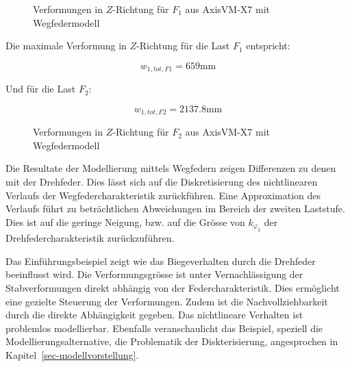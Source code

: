 \documentclass[
  11pt,
  letterpaper,
]{scrreprt}
\begin{document}
\begin{figure}[H]


\caption{\label{fig-f1-wegfeder}Verformungen in \(Z\)-Richtung für
\(F_1\) aus AxisVM-X7 mit Wegfedermodell}

\end{figure}%

Die maximale Verformung in \(Z\)-Richtung für die Last \(F_1\)
entspricht:

\[
w_{1,tot,F1} = 659 \text{mm}
\]

Und für die Last \(F_2\):

\[
w_{1,tot,F2} = 2137.8 \text{mm}
\]

\begin{figure}[H]


\caption{\label{fig-f2-wegfeder}Verformungen in \(Z\)-Richtung für
\(F_2\) aus AxisVM-X7 mit Wegfedermodell}

\end{figure}%

Die Resultate der Modellierung mittels Wegfedern zeigen Differenzen zu
denen mit der Drehfeder. Dies lässt sich auf die Diskretisierung des
nichtlinearen Verlaufs der Wegfedercharakteristik zurückführen. Eine
Approximation des Verlaufs führt zu beträchtlichen Abweichungen im
Bereich der zweiten Laststufe. Dies ist auf die geringe Neigung, bzw.
auf die Grösse von \(k_{\varphi_2}\) der Drehfedercharakteristik
zurückzuführen.

Das Einführungsbeispiel zeigt wie das Biegeverhalten durch die Drehfeder
beeinflusst wird. Die Verformungsgrösse ist unter Vernachlässigung der
Stabverformungen direkt abhängig von der Federcharakteristik. Dies
ermöglicht eine gezielte Steuerung der Verformungen. Zudem ist die
Nachvollziehbarkeit durch die direkte Abhängigkeit gegeben. Das
nichtlineare Verhalten ist problemlos modellierbar. Ebenfalls
veranschaulicht das Beispiel, speziell die Modellierungsalternative, die
Problematik der Diskterisierung, angesprochen in
Kapitel~\ref{sec-modellvorstellung}.
\end{document}
